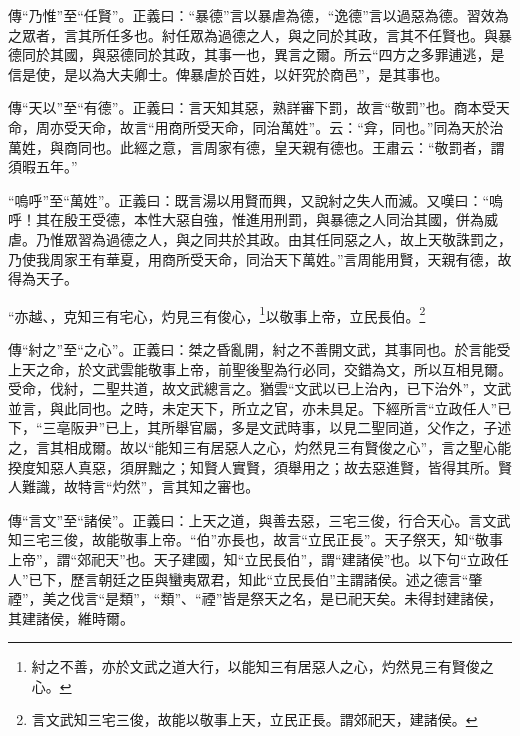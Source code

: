 {\noindent\zhuan{}\fzbyks 傳“乃惟”至“任賢”。正義曰：“暴德”言以暴虐為德，“逸德”言以過惡為德。習效為之眾者，言其所任多也。紂任眾為過德之人，與之同於其政，言其不任賢也。與暴德同於其國，與惡德同於其政，其事一也，異言之爾。所云“四方之多罪逋逃，是信是使，是以為大夫卿士。俾暴虐於百姓，以奸究於商邑”，是其事也。 \par}

{\noindent\zhuan{}\fzbyks 傳“天以”至“有德”。正義曰：言天知其惡，熟詳審下罰，故言“敬罰”也。商本受天命，周亦受天命，故言“用商所受天命，同治萬姓”。云：“弇，同也。”同為天於治萬姓，與商同也。此經之意，言周家有德，皇天親有德也。王肅云：“敬罰者，謂須暇五年。” \par}

{\noindent\shu{}\fzkt “嗚呼”至“萬姓”。正義曰：既言湯以用賢而興，又說紂之失人而滅。又嘆曰：“嗚呼！其在殷王受德，本性大惡自強，惟進用刑罰，與暴德之人同治其國，併為威虐。乃惟眾習為過德之人，與之同共於其政。由其任同惡之人，故上天敬誅罰之，乃使我周家王有華夏，用商所受天命，同治天下萬姓。”言周能用賢，天親有德，故得為天子。 \par}

“亦越、，克知三有宅心，灼見三有俊心，\footnote{紂之不善，亦於文武之道大行，以能知三有居惡人之心，灼然見三有賢俊之心。}以敬事上帝，立民長伯。\footnote{言文武知三宅三俊，故能以敬事上天，立民正長。謂郊祀天，建諸侯。}


{\noindent\zhuan{}\fzbyks 傳“紂之”至“之心”。正義曰：桀之昏亂開，紂之不善開文武，其事同也。於言能受上天之命，於文武雲能敬事上帝，前聖後聖為行必同，交錯為文，所以互相見爾。受命，伐紂，二聖共道，故文武總言之。猶雲“文武以已上治內，已下治外”，文武並言，與此同也。之時，未定天下，所立之官，亦未具足。下經所言“立政任人”已下，“三亳阪尹”已上，其所舉官屬，多是文武時事，以見二聖同道，父作之，子述之，言其相成爾。故以“能知三有居惡人之心，灼然見三有賢俊之心”，言之聖心能揆度知惡人真惡，須屏黜之；知賢人實賢，須舉用之；故去惡進賢，皆得其所。賢人難識，故特言“灼然”，言其知之審也。 \par}

{\noindent\zhuan{}\fzbyks 傳“言文”至“諸侯”。正義曰：上天之道，與善去惡，三宅三俊，行合天心。言文武知三宅三俊，故能敬事上帝。“伯”亦長也，故言“立民正長”。天子祭天，知“敬事上帝”，謂“郊祀天”也。天子建國，知“立民長伯”，謂“建諸侯”也。以下句“立政任人”已下，歷言朝廷之臣與蠻夷眾君，知此“立民長伯”主謂諸侯。述之德言“肇禋”，美之伐言“是類”，“類”、“禋”皆是祭天之名，是已祀天矣。未得封建諸侯，其建諸侯，維時爾。 \par}

